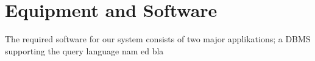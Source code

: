 \section{Equipment and Software}
\label{sec:equipmentsoftware}

The required software for our system consists of two major applikations; a DBMS supporting the query language nam
ed \sql[] bla